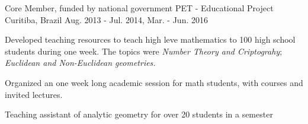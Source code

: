 \begin{cventries}
  \cventry
    {Core Member, funded by national government} %
    {PET - Educational Project} %
    {Curitiba, Brazil} %
    {Aug. 2013 - Jul. 2014, Mar. - Jun. 2016} %
    {
      \begin{cvitems} %
        \item {Developed teaching resources to teach high leve mathematics
        to 100 high school students during one week. The topics were
        \textit{Number Theory and Criptograhy}; \textit{Euclidean and Non-Euclidean geometries.}}
        \item {Organized an one week long academic session for math students,
        with courses and invited lectures.}
        \item {Teaching assistant of analytic geometry for over 20 students 
            in a semester} 
      \end{cvitems}
    }


\end{cventries}
